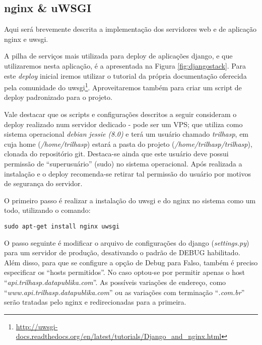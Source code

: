\subsection{nginx \& uWSGI}
Aqui será brevemente descrita a implementação dos servidores web e de aplicação \gls{nginx} e \gls{uwsgi}.

A pilha de serviços mais utilizada para deploy de aplicações \gls{django}, e que utilizaremos nesta aplicação, é a apresentada na Figura \ref{fig:djangostack}.
Para este \textit{deploy} inicial iremos utilizar o tutorial da própria documentação oferecida pela comunidade do \gls{uwsgi}\footnote{\url{http://uwsgi-docs.readthedocs.org/en/latest/tutorials/Django_and_nginx.html}}. Aproveitaremos também para criar um script de deploy padronizado para o projeto.

Vale destacar que os scripts e configurações descritos a seguir consideram o deploy realizado num servidor dedicado - pode ser um VPS; que utiliza como sistema operacional \textit{debian jessie (8.0)} e terá um usuário chamado \textit{trilhasp}, em cuja home (\textit{/home/trilhasp}) estará a pasta do projeto (\textit{/home/trilhasp/trilhasp}), clonada do repositório git. Destaca-se ainda que este usuário deve possui permissão de ``superusuário'' (sudo) no sistema operacional. Após realizada a instalação e o deploy recomenda-se retirar tal permissão do usuário por motivos de segurança do servidor.

O primeiro passo é realizar a instalação do \gls{uwsgi} e do \gls{nginx} no sistema como um todo, utilizando o comando:
\begin{lstlisting}[caption={Instalando nginx e uwsgi no sistema}]
sudo apt-get install nginx uwsgi
\end{lstlisting}

O passo seguinte é modificar o arquivo de configurações do \gls{django} (\textit{settings.py}) para um servidor de produção, desativando o padrão de DEBUG habilitado. Além disso, para que se configure a opção de Debug para Falso, também é preciso especificar os ``hosts permitidos''. No caso optou-se por permitir apenas o host ``\textit{api.trilhasp.datapublika.com}''. As possíveis variações de endereço, como ``\textit{www.api.trilhasp.datapublika.com}'' ou as variações com terminação ``\textit{.com.br}'' serão tratadas pelo \gls{nginx} e redirecionadas para a primeira.


